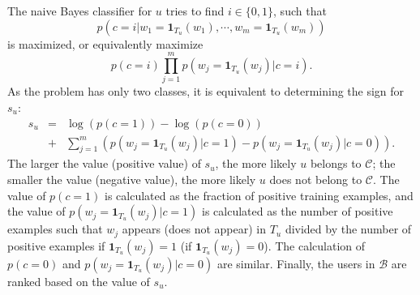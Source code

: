 \documentclass{article}
\begin{document}
The naive Bayes classifier for $u$ tries to find $i \in \{0, 1\}$, such that
$$p(c=i | w_1 = \mathbf{1}_{T_u}(w_1), \cdots, w_m = \mathbf{1}_{T_u}(w_m))$$
is maximized, or equivalently maximize
$$p(c = i) \prod_{j=1}^m p(w_j = \mathbf{1}_{T_u}(w_j) | c = i).$$
As the problem has only two classes, it is equivalent to determining the sign for $s_u$:
\begin{eqnarray}
s_u & = & \log(p(c = 1)) - \log(p(c = 0)) \nonumber \\
    & + & \sum_{j=1}^m (p(w_j = \mathbf{1}_{T_u}(w_j)|c = 1) - p(w_j = \mathbf{1}_{T_u}(w_j)|c = 0)). \nonumber
\end{eqnarray}
The larger the value (positive value) of $s_u$, the more likely $u$ belongs to $\mathcal{C}$; the smaller the value (negative value), the more likely $u$ does not belong to $\mathcal{C}$. The value of $p(c = 1)$ is calculated as the fraction of positive training examples, and the value of $p(w_j = \mathbf{1}_{T_u}(w_j)|c = 1)$ is calculated as the number of positive examples such that $w_j$ appears (does not appear) in $T_u$ divided by the number of positive examples if $\mathbf{1}_{T_u}(w_j) = 1$ (if $\mathbf{1}_{T_u}(w_j) = 0$). The calculation of $p(c = 0)$ and $p(w_j = \mathbf{1}_{T_u}(w_j)|c = 0)$ are similar. Finally, the users in $\mathcal{B}$ are ranked based on the value of $s_u$.



\end{document}
